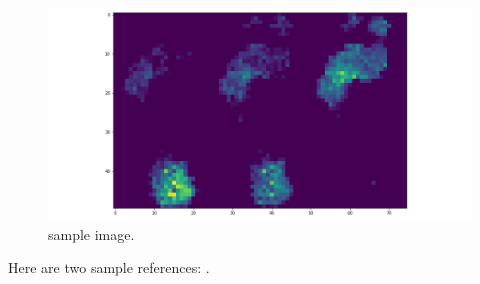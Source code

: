 \begin{figure}
    \centering
    \begin{minipage}[b]{.5\textwidth}
        \includegraphics[width=\textwidth]{figures/project/frame1.png}
    \end{minipage}
    \caption{sample image.}
    \label{fig:Stepscan_dataset}
\end{figure}


Here are two sample references: \cite{SKazemii/EE6563}.